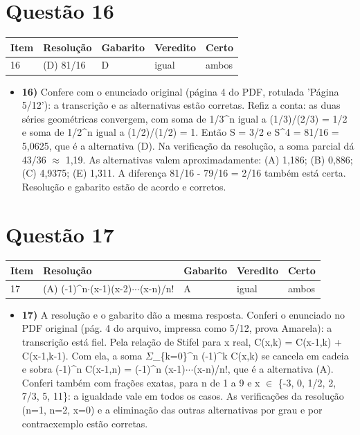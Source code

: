 \documentclass{article}%
\begin{document}
\section*{Questão 16}%
\begin{longtable}{@{}p{} p{} p{} p{} p{}@{}}\toprule Item & Resolução & Gabarito & Veredito & Certo \\ \midrule
16 & (D) 81/16 & D & igual & ambos \\
\bottomrule\end{longtable}%
\begin{itemize}%
\item%
\textbf{16)} Confere com o enunciado original (página 4 do PDF, rotulada 'Página 5/12'): a transcrição e as alternativas estão corretas. Refiz a conta: as duas séries geométricas convergem, com soma de 1/3\^{}n igual a (1/3)/(2/3) = 1/2 e soma de 1/2\^{}n igual a (1/2)/(1/2) = 1. Então S = 3/2 e S\^{}4 = 81/16 = 5,0625, que é a alternativa (D). Na verificação da resolução, a soma parcial dá 43/36 $\approx$ 1,19. As alternativas valem aproximadamente: (A) 1,186; (B) 0,886; (C) 4,9375; (E) 1,311. A diferença 81/16 - 79/16 = 2/16 também está certa. Resolução e gabarito estão de acordo e corretos.%
\end{itemize}%
\section*{Questão 17}%
\begin{longtable}{@{}p{} p{} p{} p{} p{}@{}}\toprule Item & Resolução & Gabarito & Veredito & Certo \\ \midrule
17 & (A) ({-}1)\^{}n$\cdot$(x{-}1)(x{-}2)$\cdot$$\cdot$$\cdot$(x{-}n)/n! & A & igual & ambos \\
\bottomrule\end{longtable}%
\begin{itemize}%
\item%
\textbf{17)} A resolução e o gabarito dão a mesma resposta. Conferi o enunciado no PDF original (pág. 4 do arquivo, impressa como 5/12, prova Amarela): a transcrição está fiel. Pela relação de Stifel para x real, C(x,k) = C(x{-}1,k) + C(x{-}1,k{-}1). Com ela, a soma $\Sigma$\_\{k=0\}\^{}n ({-}1)\^{}k C(x,k) se cancela em cadeia e sobra ({-}1)\^{}n C(x{-}1,n) = ({-}1)\^{}n (x{-}1)$\cdot$$\cdot$$\cdot$(x{-}n)/n!, que é a alternativa (A). Conferi também com frações exatas, para n de 1 a 9 e x $\in$ \{{-}3, 0, 1/2, 2, 7/3, 5, 11\}: a igualdade vale em todos os casos. As verificações da resolução (n=1, n=2, x=0) e a eliminação das outras alternativas por grau e por contraexemplo estão corretas.%
\end{itemize}%
\end{document}
